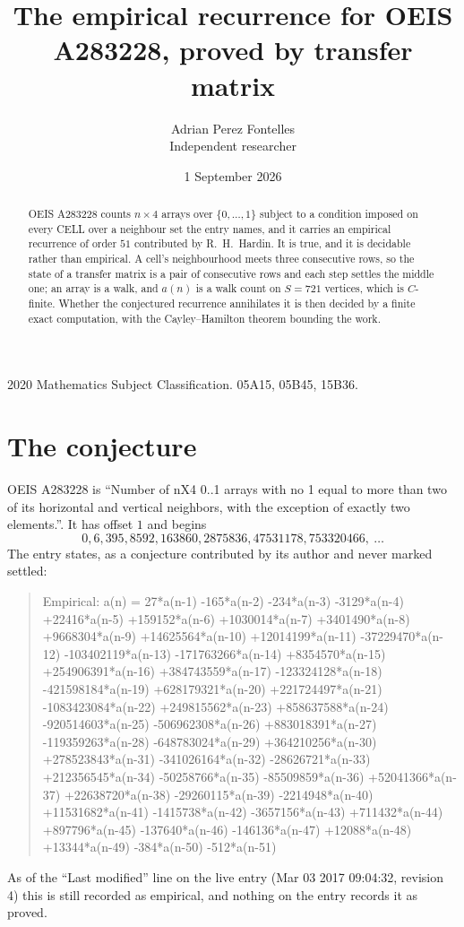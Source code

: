 \documentclass[11pt,a4paper]{article}
\title{The empirical recurrence for OEIS A283228, proved by transfer matrix}
\author{Adrian Perez Fontelles\\ \small Independent researcher}
\date{1 September 2026}
\theoremstyle{plain}
\theoremstyle{definition}
\begin{document}
\maketitle

\begin{abstract}
OEIS A283228 counts $n\times4$ arrays over $\{0,\dots,1\}$ subject to a condition imposed on
every CELL over a neighbour set the entry names, and it carries an empirical recurrence of
order $51$ contributed by R.~H.~Hardin. It is true, and it is decidable rather than
empirical. A cell's neighbourhood meets three consecutive rows, so the state of a transfer
matrix is a pair of consecutive rows and each step settles the middle one; an array is a
walk, and $a(n)$ is a walk count on $S=721$ vertices, which is $C$-finite. Whether the
conjectured recurrence annihilates it is then decided by a finite exact computation, with the
Cayley--Hamilton theorem bounding the work.
\end{abstract}

\noindent\small 2020 Mathematics Subject Classification. 05A15, 05B45, 15B36.\normalsize

\section{The conjecture}

OEIS A283228 is ``Number of nX4 0..1 arrays with no 1 equal to more than two of its horizontal and vertical neighbors, with the exception of exactly two elements.''. It has offset $1$ and begins
\[
0, 6, 395, 8592, 163860, 2875836, 47531178, 753320466,\ \dots
\]
The entry states, as a conjecture contributed by its author and never marked settled:
\begin{quote}
Empirical: a(n) = 27*a(n-1) -165*a(n-2) -234*a(n-3) -3129*a(n-4) +22416*a(n-5) +159152*a(n-6) +1030014*a(n-7) +3401490*a(n-8) +9668304*a(n-9) +14625564*a(n-10) +12014199*a(n-11) -37229470*a(n-12) -103402119*a(n-13) -171763266*a(n-14) +8354570*a(n-15) +254906391*a(n-16) +384743559*a(n-17) -123324128*a(n-18) -421598184*a(n-19) +628179321*a(n-20) +221724497*a(n-21) -1083423084*a(n-22) +249815562*a(n-23) +858637588*a(n-24) -920514603*a(n-25) -506962308*a(n-26) +883018391*a(n-27) -119359263*a(n-28) -648783024*a(n-29) +364210256*a(n-30) +278523843*a(n-31) -341026164*a(n-32) -28626721*a(n-33) +212356545*a(n-34) -50258766*a(n-35) -85509859*a(n-36) +52041366*a(n-37) +22638720*a(n-38) -29260115*a(n-39) -2214948*a(n-40) +11531682*a(n-41) -1415738*a(n-42) -3657156*a(n-43) +711432*a(n-44) +897796*a(n-45) -137640*a(n-46) -146136*a(n-47) +12088*a(n-48) +13344*a(n-49) -384*a(n-50) -512*a(n-51)
\end{quote}
As of the ``Last modified'' line on the live entry (Mar 03 2017 09:04:32, revision 4) this is still
recorded as empirical, and nothing on the entry records it as proved.
\end{document}
